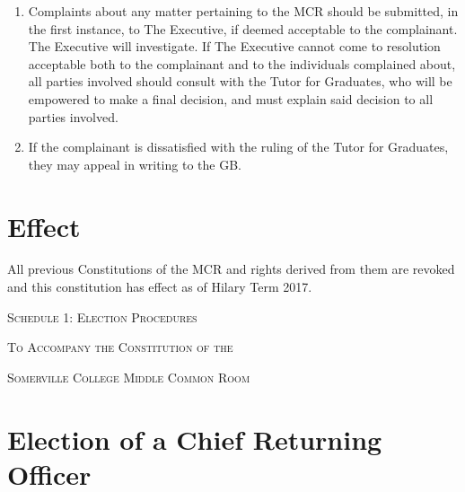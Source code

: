 \documentclass[11pt, a4paper]{article}
\begin{document}
\begin{enumerate}
    \item Complaints about any matter pertaining to the MCR should be submitted, in the first instance, to The Executive, if deemed acceptable to the complainant. The Executive will investigate. If The Executive cannot come to resolution acceptable both to the complainant and to the individuals complained about, all parties involved should consult with the Tutor for Graduates, who will be empowered to make a final decision, and must explain said decision to all parties involved.
    \item If the complainant is dissatisfied with the ruling of the Tutor for Graduates, they may appeal in writing to the GB.
\end{enumerate}





\section{Effect}
\label{sec:effect}

All previous Constitutions of the MCR and rights derived from them are revoked and this constitution has effect as of Hilary Term 2017.





\clearpage
\setcounter{section}{0}





\centerline{{\Huge \textsc{Schedule 1: Election Procedures}}}
\vspace{2mm}
\centerline{{\Large \textsc{To Accompany the Constitution of the}}}
\vspace{2mm}
\centerline{{\Large \textsc{Somerville College Middle Common Room}}}





\section{Election of a Chief Returning Officer}
\label{sec:cro}
\end{document}
